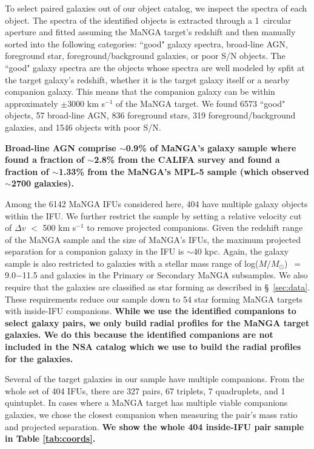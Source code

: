 \documentclass[iop,revtex4,twocolumn,apj,numberedappendix,appendixfloats]{emulateapj}
\newcommand{\logm}{log($M/M_{\odot}$)}
\begin{document}
To select paired galaxies out of our object catalog, we inspect the spectra of each object. The spectra of the identified objects is extracted through a 1\arcsec\ circular aperture and fitted assuming the MaNGA target's redshift and then manually sorted into the following categories: ``good" galaxy spectra, broad-line AGN, foreground star, foreground/background galaxies, or poor S/N objects. The ``good" galaxy spectra are the objects whose spectra are well modeled by {\sc spfit} at the target galaxy's redshift, whether it is the target galaxy itself or a nearby companion galaxy. This means that the companion galaxy can be within approximately $\pm$3000 km s$^{-1}$ of the MaNGA target. We found 6573 ``good" objects, 57 broad-line AGN, 836 foreground stars, 319 foreground/background galaxies, and 1546 objects with poor S/N. 

\textbf{Broad-line AGN comprise $\sim$0.9\% of MaNGA's galaxy sample where \citet{Lacerda:2020} found a fraction of $\sim$2.8\% from the CALIFA survey and \citet{Sanchez:2018} found a fraction of $\sim$1.33\% from the MaNGA's MPL-5 sample (which observed $\sim$2700 galaxies).  
}

Among the 6142 MaNGA IFUs considered here, 404 have multiple galaxy objects within the IFU. We further restrict the sample by setting a relative velocity cut of $\Delta v$ $<$ 500 km s$^{-1}$ to remove projected companions. Given the redshift range of the MaNGA sample and the size of MaNGA's IFUs, the maximum projected separation for a companion galaxy in the IFU is $\sim$40 kpc. Again, the galaxy sample is also restricted to galaxies with a stellar mass range of \logm\ $=$ 9.0$-$11.5 and galaxies in the Primary or Secondary MaNGA subsamples. We also require that the galaxies are classified as star forming as described in \S~\ref{sec:data}. These requirements reduce our sample down to 54 star forming MaNGA targets with inside-IFU companions. \textbf{While we use the identified companions to select galaxy pairs, we only build radial profiles for the MaNGA target galaxies. We do this because the identified companions are not included in the NSA catalog which we use to build the radial profiles for the galaxies.}

Several of the target galaxies in our sample have multiple companions. From the whole set of 404 IFUs, there are 327 pairs, 67 triplets, 7 quadruplets, and 1 quintuplet. In cases where a MaNGA target has multiple viable companions galaxies, we chose the closest companion when measuring the pair's mass ratio and projected separation.  \textbf{We show the whole 404 inside-IFU pair sample in Table \ref{tab:coords}.}
\end{document}
